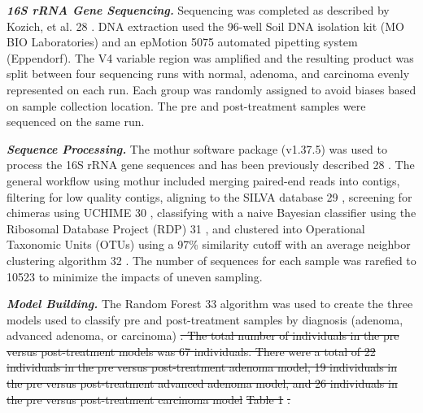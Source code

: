 \documentclass[12pt,]{article}
\providecommand{\DIFaddtex}[1]{{\protect\color{blue}\uwave{#1}}} %
\providecommand{\DIFdeltex}[1]{{\protect\color{red}\sout{#1}}}                      %
\providecommand{\DIFaddbegin}{} %
\providecommand{\DIFaddend}{} %
\providecommand{\DIFdelbegin}{} %
\providecommand{\DIFdelend}{} %
\providecommand{\DIFadd}[1]{\texorpdfstring{\DIFaddtex{#1}}{#1}} %
\providecommand{\DIFdel}[1]{\texorpdfstring{\DIFdeltex{#1}}{}} %
\begin{document}
\textbf{\emph{16S rRNA Gene Sequencing.}} Sequencing was completed as
described by Kozich, et al. \DIFdelbegin %
\DIFdelend \DIFaddbegin \DIFadd{(}\DIFaddend 28\DIFdelbegin %
\DIFdelend \DIFaddbegin \DIFadd{)}\DIFaddend . DNA extraction used the 96-well Soil
DNA isolation kit (MO BIO Laboratories) and an epMotion 5075 automated
pipetting system (Eppendorf). The V4 variable region was amplified and
the resulting product was split between four sequencing runs with
normal, adenoma, and carcinoma evenly represented on each run. Each
group was randomly assigned to avoid biases based on sample collection
location. The pre and post-treatment samples were sequenced on the same
run.

\textbf{\emph{Sequence Processing.}} The mothur software package
(v1.37.5) was used to process the 16S rRNA gene sequences and has been
previously described \DIFdelbegin %
\DIFdelend \DIFaddbegin \DIFadd{(}\DIFaddend 28\DIFdelbegin %
\DIFdelend \DIFaddbegin \DIFadd{)}\DIFaddend . The general workflow using mothur included
merging paired-end reads into contigs, filtering for low quality
contigs, aligning to the SILVA database \DIFdelbegin %
\DIFdelend \DIFaddbegin \DIFadd{(}\DIFaddend 29\DIFdelbegin %
\DIFdelend \DIFaddbegin \DIFadd{)}\DIFaddend , screening for chimeras
using UCHIME \DIFdelbegin %
\DIFdelend \DIFaddbegin \DIFadd{(}\DIFaddend 30\DIFdelbegin %
\DIFdelend \DIFaddbegin \DIFadd{)}\DIFaddend , classifying with a naive Bayesian classifier using
the Ribosomal Database Project (RDP)\DIFdelbegin %
\DIFdelend \DIFaddbegin \DIFadd{(}\DIFaddend 31\DIFdelbegin %
\DIFdelend \DIFaddbegin \DIFadd{)}\DIFaddend , and clustered into Operational
Taxonomic Units (OTUs) using a 97\% similarity cutoff with an average
neighbor clustering algorithm \DIFdelbegin %
\DIFdelend \DIFaddbegin \DIFadd{(}\DIFaddend 32\DIFdelbegin %
\DIFdelend \DIFaddbegin \DIFadd{)}\DIFaddend . The number of sequences for each
sample was rarefied to 10523 to minimize the impacts of uneven sampling.

\textbf{\emph{Model Building.}} The Random Forest \DIFdelbegin %
\DIFdelend \DIFaddbegin \DIFadd{(}\DIFaddend 33\DIFdelbegin %
\DIFdelend \DIFaddbegin \DIFadd{) }\DIFaddend algorithm was
used to create the three models used to classify pre and post-treatment
samples by diagnosis (adenoma, advanced adenoma, or carcinoma) \DIFdelbegin \DIFdel{. The
total number of individuals in the pre versus post-treatment models was
67 individuals. There were a total of 22 individuals in the pre versus
post-treatment adenoma model, 19 individuals in the pre versus
post-treatment advanced adenoma model, and 26 individuals in the pre
versus post-treatment carcinoma model }%
\DIFdel{Table 1}%
\DIFdel{.
}%
\end{document}
